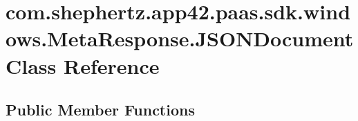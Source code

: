 \hypertarget{classcom_1_1shephertz_1_1app42_1_1paas_1_1sdk_1_1windows_1_1_meta_response_1_1_j_s_o_n_document}{\section{com.\+shephertz.\+app42.\+paas.\+sdk.\+windows.\+Meta\+Response.\+J\+S\+O\+N\+Document Class Reference}
\label{classcom_1_1shephertz_1_1app42_1_1paas_1_1sdk_1_1windows_1_1_meta_response_1_1_j_s_o_n_document}
}


 


\subsection*{Public Member Functions}

